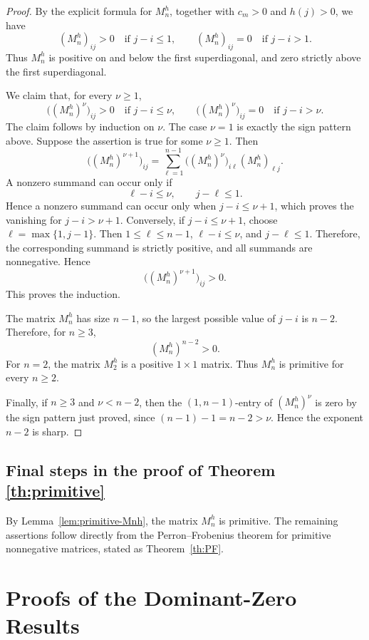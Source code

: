\documentclass[11pt,reqno]{amsart}
\theoremstyle{plain}
\theoremstyle{remark}
\theoremstyle{definition}
\numberwithin{equation}{section}
\newcommand{\Mnhexp}{\nu }
\begin{document}
\begin{proof}
By the explicit formula for $M_n^h$, together with $c_m>0$ and $h(j)>0$,
we have
\[
   (M_n^h)_{ij}>0 \quad\text{if } j-i\le 1,
   \qquad
   (M_n^h)_{ij}=0 \quad\text{if } j-i>1 .
\]
Thus $M_n^h$ is positive on and below
the first
superdiagonal, and zero strictly above the first superdiagonal.

We claim that, for every $\Mnhexp
\ge1$,
\[
   \bigl((M_n^h)^{\Mnhexp }
\bigr)_{ij}>0
   \quad\text{if } j-i\le \Mnhexp ,
   \qquad
   \bigl((M_n^h)^{\Mnhexp }
\bigr)_{ij}=0
   \quad\text{if } j-i>\Mnhexp .
\]
The claim follows by induction on $\Mnhexp $. The case $\Mnhexp
=1$ is exactly the sign
pattern above. Suppose the assertion is true for some $\Mnhexp \ge1$. Then
\[
   \bigl((M_n^h)^{\Mnhexp
+1}\bigr)_{ij}
   =
   \sum_{\ell=1}^{n-1}
   \bigl((M_n^h)^{\Mnhexp }\bigr)_{i\ell}(M_n^h)_{\ell j}.
\]
A nonzero summand can occur only if
\[
   \ell-i\le \Mnhexp
,
   \qquad
   j-\ell\le 1.
\]
Hence a nonzero summand can occur only when $j-i\le \Mnhexp
+1$, which proves the
vanishing for $j-i>\Mnhexp
+1$. Conversely, if $j-i\le \Mnhexp
+1$, choose
$\ell=\max\{1,j-1\}$. Then $1\le\ell\le n-1$, $\ell-i\le \Mnhexp
$, and
$j-\ell\le1$. Therefore,
the corresponding summand is strictly positive,
and all summands are nonnegative. Hence
\[
   \bigl((M_n^h)^{\Mnhexp
+1}\bigr)_{ij}>0.
\]
This proves the induction.

The matrix $M_n^h$ has size $n-1$, so the largest possible value of
$j-i$ is $n-2$. Therefore, for $n\ge3$,
\[
   (M_n^h)^{n-2}>0.
\]
For $n=2$, the matrix $M_2^h$ is a positive $1\times1$ matrix. Thus
$M_n^h$ is primitive for every $n\ge2$.

Finally, if $n\ge3$ and $\Mnhexp
<n-2$, then the $(1,n-1)$-entry of
$(M_n^h)^{\Mnhexp }$ is zero by the sign pattern just proved, since
$(n-1)-1=n-2>\Mnhexp
$. Hence the exponent $n-2$ is sharp.
\end{proof}
\subsection{Final steps in the proof of Theorem \ref{th:primitive}}

By Lemma~\ref{lem:primitive-Mnh}, the matrix $M_n^h$ is primitive. The remaining
assertions follow directly from the Perron--Frobenius theorem for primitive
nonnegative matrices, stated as Theorem~\ref{th:PF}.



\section{Proofs of the
Dominant-Zero
Results}
\label{sec:proof-main}
\end{document}

